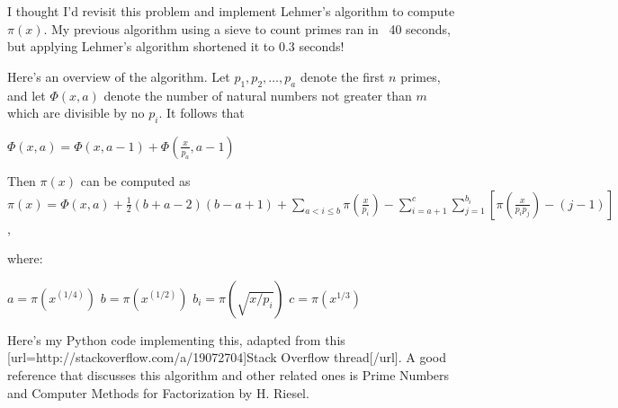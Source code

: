 
I thought I'd revisit this problem and implement Lehmer's algorithm to compute $\pi(x)$.  My previous algorithm using a sieve to count primes ran in ~40 seconds, but applying Lehmer's algorithm shortened it to 0.3 seconds!

Here's an overview of the algorithm.  Let $p_1, p_2, \dots, p_a$ denote the first $n$ primes, and let $\Phi(x, a)$ denote the number of natural numbers not greater than $m$ which are divisible by no $p_i$.  It follows that 

$\Phi(x, a) = \Phi(x, a-1) + \Phi \left ( \frac{x}{p_{a}}, a-1 \right )$

Then $\pi(x)$ can be computed as
$ \pi(x) = \Phi(x, a) + \frac{1}{2} (b+a-2)(b-a+1) + \sum_{a < i \leq b} \pi \left ( \frac{x}{p_i} \right ) - \sum_{i=a+1}^{c} \sum_{j=1}^{b_i} \left [ \pi \left ( \frac{x}{p_i p_j} \right ) - (j-1) \right ]$
,

where:

$a = \pi(x^{(1/4)})$
$b = \pi(x^{(1/2)})$
$b_i = \pi(\sqrt{x/p_i})$
$c = \pi(x^{1/3})$

Here's my Python code implementing this, adapted from this [url=http://stackoverflow.com/a/19072704]Stack Overflow thread[/url].  A good reference that discusses this algorithm and other related ones is Prime Numbers and Computer Methods for Factorization by H. Riesel.  
